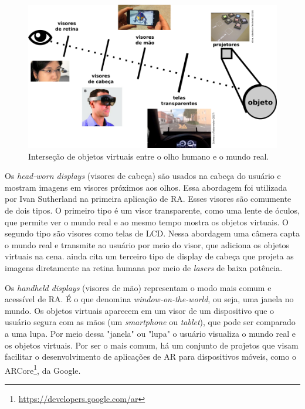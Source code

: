 \begin{figure}[h]
    \centering
    \includegraphics[width=.9\linewidth,fbox]{figs/ra_displays.png}
    \caption{Interseção de objetos virtuais entre o olho humano e o mundo real. }
    \label{fig:ra_displays}
\end{figure}


Os \textit{head-worn displays} (visores de cabeça) são usados na cabeça do usuário e mostram imagens em visores próximos aos olhos. Essa abordagem foi utilizada por Ivan Sutherland na primeira aplicação de RA. Esses visores são comumente de dois tipos. O primeiro tipo é um visor transparente, como uma lente de óculos, que permite ver o mundo real e ao mesmo tempo mostra os objetos virtuais. O segundo tipo são visores como telas de LCD. Nessa abordagem uma câmera capta o mundo real e transmite ao usuário por meio do visor, que adiciona os objetos virtuais na cena.  ainda cita um terceiro tipo de display de cabeça que projeta as imagens diretamente na retina humana por meio de \textit{lasers} de baixa potência.


Os \textit{handheld displays} (visores de mão) representam o modo mais comum e acessível de RA. É o que  denomina \textit{window-on-the-world}, ou seja, uma janela no mundo. Os objetos virtuais aparecem em um visor de um dispositivo que o usuário segura com as mãos (um \textit{smartphone} ou \textit{tablet}), que pode ser comparado a uma lupa. Por meio dessa "janela" ou "lupa" o usuário visualiza o mundo real e os objetos virtuais. Por ser o mais comum, há um conjunto de projetos que visam facilitar o desenvolvimento de aplicações de AR para dispositivos móveis, como o ARCore\footnote{\url{https://developers.google.com/ar}}, da Google.

